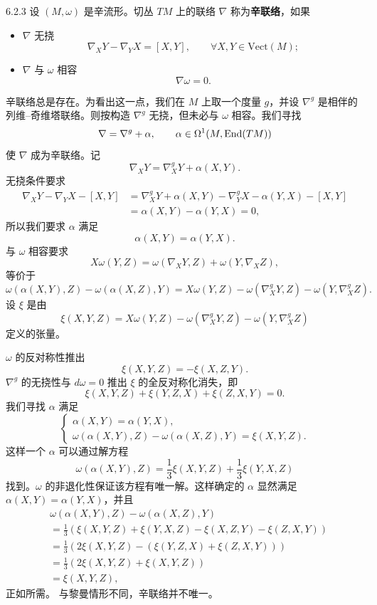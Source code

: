 \begin{definition}{6.2.3}
  设 $(M,\omega)$ 是辛流形。切丛 $TM$ 上的联络 $\nabla$ 称为\textbf{辛联络}，如果
  \begin{itemize}[leftmargin=1.6em,itemsep=0.2em]
  \item[①] $\nabla$ 无挠
  \[
  \nabla_XY-\nabla_YX=[X,Y],\qquad \forall X,Y\in\mathrm{Vect}(M);
  \]
  \item[②] $\nabla$ 与 $\omega$ 相容
  \[
  \nabla\omega=0.
  \]
  \end{itemize}
\end{definition}

辛联络总是存在。为看出这一点，我们在 $M$ 上取一个度量 $g$，并设 $\nabla^g$ 是相伴的列维–奇维塔联络。则按构造 $\nabla^g$ 无挠，但未必与 $\omega$ 相容。我们寻找
\[
\nabla=\nabla^g+\alpha,\qquad \alpha\in\Omega^1(M,\operatorname{End}(TM))
\]
使 $\nabla$ 成为辛联络。记
\[
\nabla_XY=\nabla^g_XY+\alpha(X,Y).
\]
无挠条件要求
\begin{align*}
\nabla_XY-\nabla_YX-[X,Y]
&=\nabla^g_XY+\alpha(X,Y)-\nabla^g_YX-\alpha(Y,X)-[X,Y]\\
&=\alpha(X,Y)-\alpha(Y,X)=0,
\end{align*}
所以我们要求 $\alpha$ 满足
\[
\alpha(X,Y)=\alpha(Y,X).
\]
与 $\omega$ 相容要求
\[
X\omega(Y,Z)=\omega(\nabla_XY,Z)+\omega(Y,\nabla_XZ),
\]
等价于
\[
\omega(\alpha(X,Y),Z)-\omega(\alpha(X,Z),Y)
=X\omega(Y,Z)-\omega(\nabla^g_XY,Z)-\omega(Y,\nabla^g_XZ).
\]
设 $\xi$ 是由
\[
\xi(X,Y,Z)=X\omega(Y,Z)-\omega(\nabla^g_XY,Z)-\omega(Y,\nabla^g_XZ)
\]
定义的张量。

$\omega$ 的反对称性推出
\[
\xi(X,Y,Z)=-\xi(X,Z,Y).
\]
$\nabla^g$ 的无挠性与 $d\omega=0$ 推出 $\xi$ 的全反对称化消失，即
\[
\xi(X,Y,Z)+\xi(Y,Z,X)+\xi(Z,X,Y)=0.
\]
我们寻找 $\alpha$ 满足
\[
\begin{cases}
\alpha(X,Y)=\alpha(Y,X),\\
\omega(\alpha(X,Y),Z)-\omega(\alpha(X,Z),Y)=\xi(X,Y,Z).
\end{cases}
\]
这样一个 $\alpha$ 可以通过解方程
\[
\omega(\alpha(X,Y),Z)=\frac13\xi(X,Y,Z)+\frac13\xi(Y,X,Z)
\]
找到。$\omega$ 的非退化性保证该方程有唯一解。这样确定的 $\alpha$ 显然满足 $\alpha(X,Y)=\alpha(Y,X)$，并且
\begin{align*}
&\omega(\alpha(X,Y),Z)-\omega(\alpha(X,Z),Y)\\
&=\frac13\left(\xi(X,Y,Z)+\xi(Y,X,Z)-\xi(X,Z,Y)-\xi(Z,X,Y)\right)\\
&=\frac13\left(2\xi(X,Y,Z)-\left(\xi(Y,Z,X)+\xi(Z,X,Y)\right)\right)\\
&=\frac13\left(2\xi(X,Y,Z)+\xi(X,Y,Z)\right)\\
&=\xi(X,Y,Z),
\end{align*}
正如所需。
与黎曼情形不同，辛联络并不唯一。

